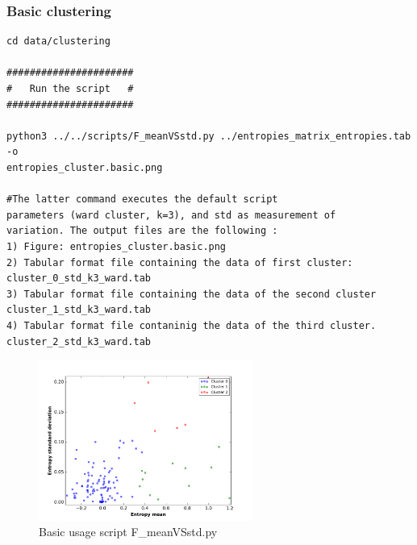 \documentclass[12pt]{report}
\begin{document}
\subsubsection{Basic clustering}
\begin{verbatim}
cd data/clustering

######################
#   Run the script   #
######################

python3 ../../scripts/F_meanVSstd.py ../entropies_matrix_entropies.tab -o 
entropies_cluster.basic.png

#The latter command executes the default script 
parameters (ward cluster, k=3), and std as measurement of 
variation. The output files are the following :
1) Figure: entropies_cluster.basic.png
2) Tabular format file containing the data of first cluster: 
cluster_0_std_k3_ward.tab
3) Tabular format file containing the data of the second cluster 
cluster_1_std_k3_ward.tab
4) Tabular format file contaninig the data of the third cluster. 
cluster_2_std_k3_ward.tab
\end{verbatim}
\begin{figure}[H]
  \centering
    \includegraphics[width=70mm, scale=1]{entropies_cluster_basic.png}
    \caption{Basic usage script F\_meanVSstd.py}
        \label{fig:cluster_basic}
\end{figure}
\end{document}

